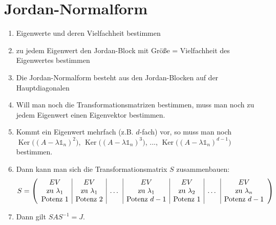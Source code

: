 \documentclass[ngerman,a4paper]{article}
\DeclareMathOperator{\Ker}{Ker}
\begin{document}
\section{Jordan-Normalform}
\begin{enumerate}[label=\textbf{\arabic*.}]
	\item Eigenwerte und deren Vielfachheit bestimmen
	\item zu jedem Eigenwert den Jordan-Block mit Größe = Vielfachheit des Eigenwertes bestimmen
	\item Die Jordan-Normalform besteht aus den Jordan-Blocken auf der Hauptdiagonalen
	\item Will man noch die Transformationsmatrizen bestimmen, muss man noch zu jedem Eigenwert einen Eigenvektor bestimmen.
	\item Kommt ein Eigenwert mehrfach (z.B. $d$-fach) vor, so muss man noch $\Ker\big((A-\lambda\mathbb{1}_n)^2\big)$, $\Ker\big((A-\lambda\mathbb{1}_n)^3\big)$, ..., $\Ker\big((A-\lambda\mathbb{1}_n)^{d-1}\big)$ bestimmen.
	\item Dann kann man sich die Transformationsmatrix $S$ zusammenbauen:
	\begin{align}
		S = \left(\begin{array}{c|c|c|c|c|c|c}
		EV & EV &  & EV & EV &  & EV \\
		\text{zu }\lambda_1 & \text{zu }\lambda_1 & \dots & \text{zu }\lambda_1 & \text{zu }\lambda_2 & \dots & \text{zu }\lambda_n \\
		\text{Potenz }1 & \text{Potenz }2 & & \text{Potenz }d-1 & \text{Potenz }1 & & \text{Potenz }d-1
		\end{array}\right)\notag
	\end{align}
	\item Dann gilt $SAS^{-1}=J$.
\end{enumerate}
\end{document}
